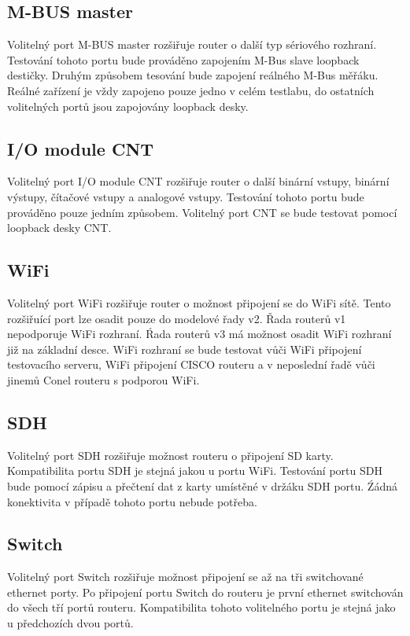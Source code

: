 \subsection{M-BUS master}
Volitelný port M-BUS master rozšiřuje router o další typ sériového rozhraní. Testování tohoto portu bude prováděno zapojením M-Bus slave loopback destičky. Druhým způsobem tesování bude zapojení reálného M-Bus měřáku. Reálné zařízení je vždy zapojeno pouze jedno v celém testlabu, do ostatních volitelných portů jsou zapojovány loopback desky.

\subsection{I/O module CNT}
Volitelný port I/O module CNT rozšiřuje router o další binární vstupy, binární výstupy, čítačové vstupy a analogové vstupy. Testování tohoto portu bude prováděno pouze jedním způsobem. Volitelný port CNT se bude testovat pomocí loopback desky CNT.

\subsection{WiFi}
Volitelný port WiFi rozšiřuje router o možnost připojení se do WiFi sítě. Tento rozšiřuící port lze osadit pouze do modelové řady v2. Řada routerů v1 nepodporuje WiFi rozhraní. Ŕada routerů v3 má možnost osadit WiFi rozhraní již na základní desce. WiFi rozhraní se bude testovat vůči WiFi připojení testovacího serveru, WiFi připojení CISCO routeru a v neposlední řadě vůči jinemů Conel routeru s podporou WiFi.

\subsection{SDH}
Volitelný port SDH rozšiřuje možnost routeru o připojení SD karty. Kompatibilita portu SDH je stejná jakou u portu WiFi. Testování portu SDH bude pomocí zápisu a přečtení dat z karty umístěné v držáku SDH portu. Źádná konektivita v případě tohoto portu nebude potřeba.

\subsection{Switch}
Volitelný port Switch rozšiřuje možnost připojení se až na tři switchované ethernet porty. Po připojení portu Switch do routeru je první ethernet switchován do všech tří portů routeru. Kompatibilita tohoto volitelného portu je stejná jako u předchozích dvou portů.

